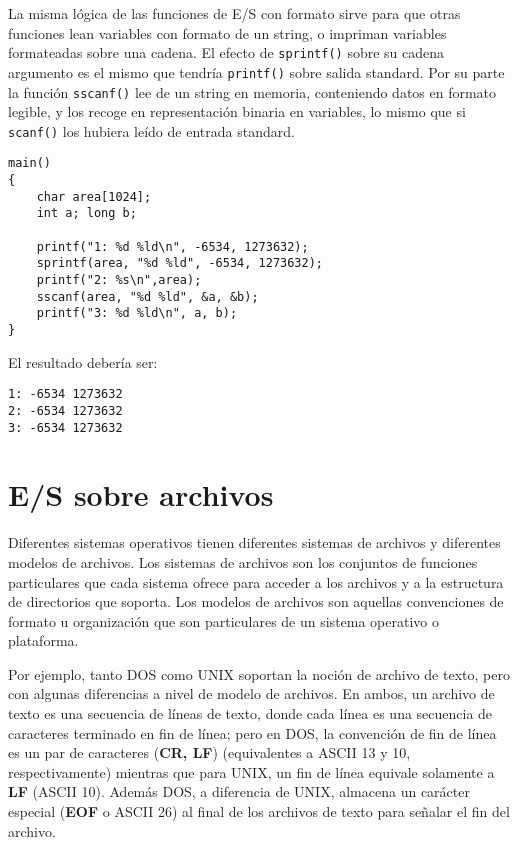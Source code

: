 La misma lógica de las funciones de E/S con formato sirve para que otras
funciones lean variables con formato de un string, o impriman variables
formateadas sobre una cadena. El efecto de \lstinline{sprintf()} sobre su cadena argumento
es el mismo que tendría \lstinline{printf()} sobre salida standard. Por su parte la función 
\lstinline{sscanf()} lee de un string en memoria, conteniendo datos en formato legible, y los
recoge en representación binaria en variables, lo mismo que si \lstinline{scanf()} los
hubiera leído de entrada standard.

\begin{ejemplo}
\begin{lstlisting}
main()
{
    char area[1024];
    int a; long b;
    
	printf("1: %d %ld\n", -6534, 1273632);
    sprintf(area, "%d %ld", -6534, 1273632);
	printf("2: %s\n",area);
    sscanf(area, "%d %ld", &a, &b);
    printf("3: %d %ld\n", a, b);
}
\end{lstlisting}

El resultado debería ser:
\begin{lstlisting}
1: -6534 1273632
2: -6534 1273632
3: -6534 1273632
\end{lstlisting}
\end{ejemplo}

\section{E/S sobre archivos}
\label{sec:esarchivos}

Diferentes sistemas operativos tienen diferentes sistemas de archivos y
diferentes modelos de archivos. Los sistemas de archivos son los conjuntos de
funciones particulares que cada sistema ofrece para acceder a los archivos y a
la estructura de directorios que soporta. Los modelos de archivos son aquellas
convenciones de formato u organización que son particulares de un sistema
operativo o plataforma.

Por ejemplo, tanto DOS como UNIX soportan la noción de archivo de texto, pero
con algunas diferencias a nivel de modelo de archivos. En ambos, un archivo de
texto es una secuencia de líneas de texto, donde cada línea es una secuencia de
caracteres terminado en fin de línea; pero en DOS, la convención de fin de
línea es un par de caracteres (\textbf{CR, LF}) (equivalentes a ASCII 13 y 10, respectivamente) mientras
que para UNIX, un fin de línea equivale solamente a \textbf{LF} (ASCII 10). Además DOS, a diferencia de UNIX,
almacena un carácter especial (\textbf{EOF} o ASCII 26) al final de los archivos 
de texto para señalar el fin del archivo.


